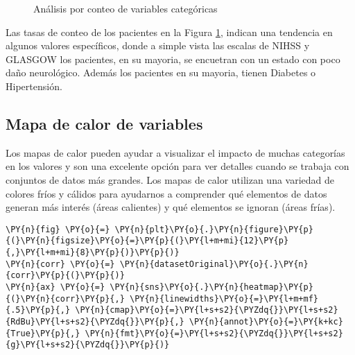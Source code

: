 \begin{center}
    	\begin{figure}[H]
	\centering
	\caption{Análisis por conteo de variables categóricas}
	\label{fig:acvc}
	\end{figure}
\end{center}
    
    Las tasas de conteo de los pacientes en la Figura \ref{fig:acvc}, indican una tendencia en algunos valores específicos, donde a simple vista las escalas de NIHSS y GLASGOW los pacientes, en su mayoria, se encuetran con un estado con poco daño neurológico. Además los pacientes en su mayoria, tienen Diabetes o Hipertensión.

    \hypertarget{mapa-de-calor-de-variables}{%
\subsection{Mapa de calor de
variables}\label{mapa-de-calor-de-variables}}

	Los mapas de calor pueden ayudar a visualizar el impacto de muchas categorías en los valores y son una excelente opción para ver detalles cuando se trabaja con conjuntos de datos más grandes. Los mapas de calor utilizan una variedad de colores fríos y cálidos para ayudarnos a comprender qué elementos de datos generan más interés (áreas calientes) y qué elementos se ignoran (áreas frías).

    \begin{tcolorbox}[breakable, size=fbox, boxrule=1pt, pad at break*=1mm,colback=cellbackground, colframe=cellborder]
\begin{Verbatim}[commandchars=\\\{\}]
\PY{n}{fig} \PY{o}{=} \PY{n}{plt}\PY{o}{.}\PY{n}{figure}\PY{p}{(}\PY{n}{figsize}\PY{o}{=}\PY{p}{(}\PY{l+m+mi}{12}\PY{p}{,}\PY{l+m+mi}{8}\PY{p}{)}\PY{p}{)}
\PY{n}{corr} \PY{o}{=} \PY{n}{datasetOriginal}\PY{o}{.}\PY{n}{corr}\PY{p}{(}\PY{p}{)}
\PY{n}{ax} \PY{o}{=} \PY{n}{sns}\PY{o}{.}\PY{n}{heatmap}\PY{p}{(}\PY{n}{corr}\PY{p}{,} \PY{n}{linewidths}\PY{o}{=}\PY{l+m+mf}{.5}\PY{p}{,} \PY{n}{cmap}\PY{o}{=}\PY{l+s+s2}{\PYZdq{}}\PY{l+s+s2}{RdBu}\PY{l+s+s2}{\PYZdq{}}\PY{p}{,} \PY{n}{annot}\PY{o}{=}\PY{k+kc}{True}\PY{p}{,} \PY{n}{fmt}\PY{o}{=}\PY{l+s+s2}{\PYZdq{}}\PY{l+s+s2}{g}\PY{l+s+s2}{\PYZdq{}}\PY{p}{)}
\end{Verbatim}
\end{tcolorbox}

